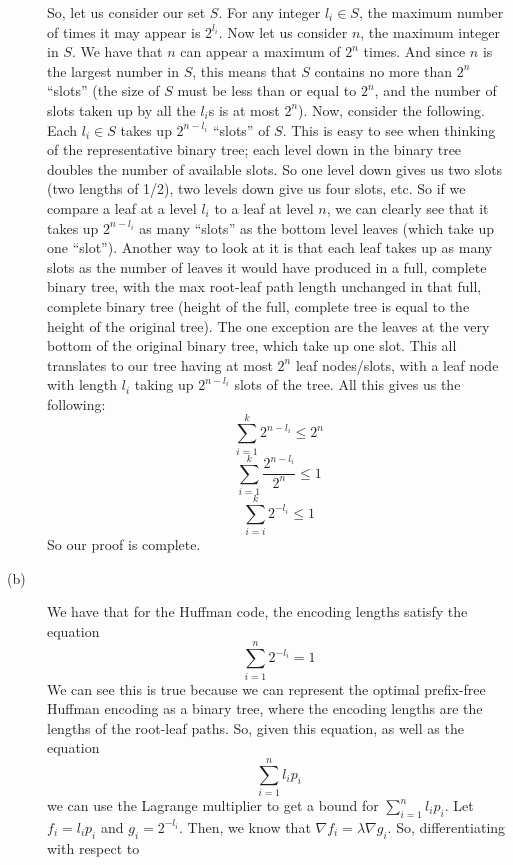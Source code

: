 \documentclass{article}
\begin{document}
\begin{description}
        So, let us consider our set $S$. For any integer $l_i \in S$, the
        maximum number of times it may appear is $2^{l_i}$. Now let us consider
        $n$, the maximum integer in $S$. We have that $n$ can appear a maximum
        of $2^n$ times. And since $n$ is the largest number in $S$, this means
        that $S$ contains no more than $2^n$ ``slots'' (the size of
        $S$ must be less than or equal to $2^n$, and the number of slots taken
        up by all the $l_i$s is at most $2^n$). Now, consider the
        following. Each $l_i \in S$ takes up $2^{n-l_i}$ ``slots'' of $S$. This
        is easy to see when thinking of the representative binary tree; each
        level down in the binary tree doubles the number of available slots. So
        one level down gives us two slots (two lengths of 1/2), two levels down
        give us four slots, etc. So if we compare a leaf at a level $l_i$ to a
        leaf at level $n$, we can clearly see that it takes up $2^{n-l_i}$ as
        many ``slots'' as the bottom level leaves (which take up one ``slot'').
        Another way to look at it is that each leaf takes up as many slots as
        the number of leaves it would have produced in a full, complete binary
        tree,
        with the max root-leaf path length unchanged in that full, complete
        binary tree (height of the full, complete tree is equal to the
        height of the original tree). The one exception are
        the leaves at the very bottom of the original
        binary tree, which take up one slot. This all translates to our tree
        having at most $2^n$ leaf nodes/slots, with a leaf node with length $l_i$ taking up
        $2^{n-l_i}$ slots of the tree. All this
        gives us the following:
        \[ \sum_{i=1}^k 2^{n-l_i} \le 2^n \]
        \[ \sum_{i=1}^k \frac{2^{n-l_i}}{2^n} \le 1 \]
        \[ \sum_{i=i}^k 2^{-l_i} \le 1 \]
        So our proof is complete.
    \item[(b)]
        We have that for the Huffman code, the encoding lengths satisfy the
        equation
        \[ \sum_{i=1}^n 2^{-l_i} = 1 \]
        We can see this is true because we can represent the optimal prefix-free
        Huffman encoding as a binary tree, where the encoding lengths are the
        lengths of the root-leaf paths. So, given this equation, as well as the
        equation
        \[ \sum_{i=1}^n l_ip_i \]
        we can use the Lagrange multiplier to get a bound for $\sum_{i=1}^n
        l_ip_i$. Let $f_i = l_ip_i$ and $g_i = 2^{-l_i}$. Then, we know that
        $\nabla f_i = \lambda \nabla g_i$. So, differentiating with respect to

\end{description}
\end{document}
